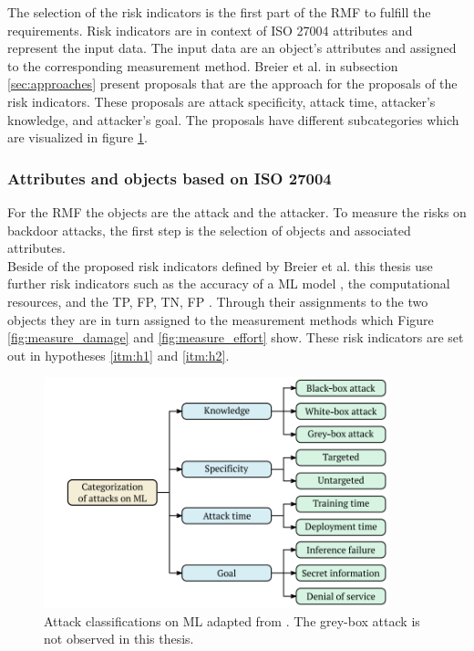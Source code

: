 The selection of the risk indicators is the first part of the RMF to fulfill the requirements. Risk indicators are in context of ISO 27004 \cite{ISO_27004_2009} attributes and represent the input data. The input data are an object's attributes and assigned to the corresponding measurement method. Breier et al. \cite{DBLP:journals/corr/abs-2012-04884} in subsection \ref{sec:approaches} present proposals that are the approach for the proposals of the risk indicators. These proposals are attack specificity, attack time, attacker's knowledge, and attacker's goal. The proposals have different subcategories which are visualized in figure \ref{fig:classifi_attacks_ml}.

\subsubsection*{Attributes and objects based on ISO 27004}

For the RMF the objects are the attack and the attacker. To measure the risks on backdoor attacks, the first step is the selection of objects and associated attributes. \\ Beside of the proposed risk indicators defined by Breier et al. this thesis use further risk indicators such as the accuracy of a ML model \cite{DBLP:journals/soco/GarciaFLH09}, the computational resources, and the TP, FP, TN, FP \cite{DBLP:journals/symmetry/PhamJAADYPNLGPT20}. Through their assignments to the two objects they are in turn assigned to the measurement methods which Figure \ref{fig:measure_damage} and \ref{fig:measure_effort} show. These risk indicators are set out in hypotheses \ref{itm:h1} and \ref{itm:h2}.

\begin{figure}[ht!]
  \centering
  \includegraphics[width=10cm]{pictures/classifi_attacks_ml.png}
  \caption{Attack classifications on ML adapted from \cite{DBLP:journals/corr/abs-2012-04884}. The grey-box attack is not observed in this thesis.}
  \label{fig:classifi_attacks_ml}
\end{figure}

